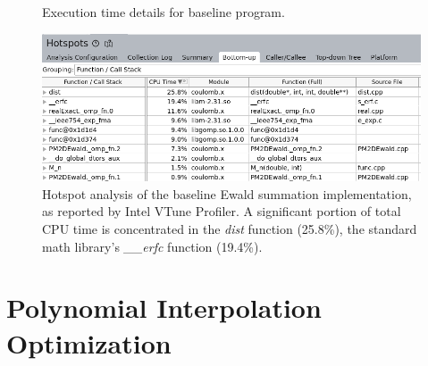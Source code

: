 \begin{figure}[H]
    \centering
    \begin{minipage}{0.7\textwidth}
    \end{minipage}%
    \begin{minipage}{0.3\textwidth}
        \caption{Execution time details for baseline program.}
    \end{minipage}
\end{figure}
\begin{figure}[h]
    \centering
    \includegraphics[width = \linewidth]{images/VTuneInitialHotspot.png}
    \caption{Hotspot analysis of the baseline Ewald summation implementation, as reported by Intel VTune Profiler. A significant portion of total CPU time is concentrated in the \textit{dist} function (25.8\%), the standard math library's \textit{\_\_erfc} function (19.4\%).}
    \label{fig:result1vtune}
\end{figure}

\section{Polynomial Interpolation Optimization}
